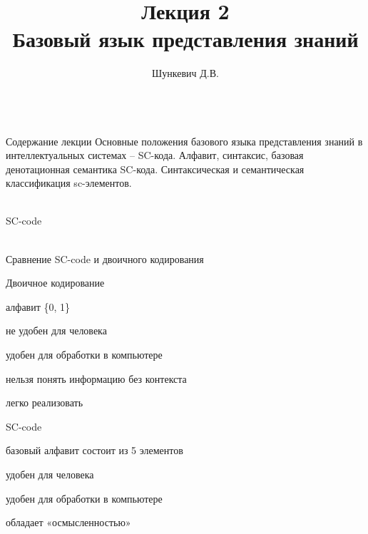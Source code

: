 \title{Лекция 2\\Базовый язык представления знаний}   
\author[]{Шункевич Д.В.}

\begin{frame}
	\titlepage
\end{frame}

\begin{frame}{\\Содержание лекции}
	\topline
	\justifying
	Основные положения базового языка представления знаний в интеллектуальных системах – SC-кода.
	Алфавит, синтаксис, базовая денотационная семантика SC-кода.
	Синтаксическая и семантическая классификация sc-элементов.
\end{frame}

\begin{frame}{\\SC-code}
	\topline
	\justifying
	\begin{SCn}
	\end{SCn}
\end{frame}

\begin{frame}{\\Сравнение SC-code и двоичного кодирования}
	\topline
	\justifying
	\vspace{10mm}
	\begin{textitemize}
		\item Двоичное кодирование
			\begin{textitemize}
				\item {алфавит \{0, 1\}}
				\item {не удобен для человека}
				\item {удобен для обработки в компьютере}
				\item {нельзя понять информацию без контекста}
				\item {легко реализовать}
			\end{textitemize}
		\item SC-code
			\begin{textitemize}
				\item {базовый алфавит состоит из 5 элементов}
				\item {удобен для человека}
				\item {удобен для обработки в компьютере}
				\item {обладает «осмысленностью»}
			\end{textitemize}
		\end{textitemize}
\end{frame}

